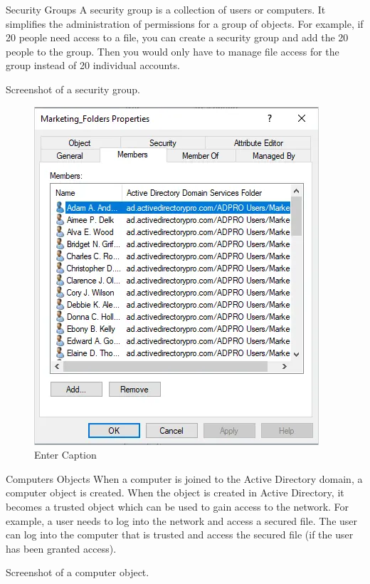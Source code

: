 Security Groups
A security group is a collection of users or computers. It simplifies the administration of permissions for a group of objects. For example, if 20 people need access to a file, you can create a security group and add the 20 people to the group. Then you would only have to manage file access for the group instead of 20 individual accounts.

Screenshot of a security group.

\begin{figure}
    \centering
    \includegraphics[width=0.75\linewidth]{usrgrp.png}
    \caption{Enter Caption}
    \label{fig:placeholder}
\end{figure}

Computers Objects
When a computer is joined to the Active Directory domain, a computer object is created. When the object is created in Active Directory, it becomes a trusted object which can be used to gain access to the network. For example, a user needs to log into the network and access a secured file. The user can log into the computer that is trusted and access the secured file (if the user has been granted access).

Screenshot of a computer object.

